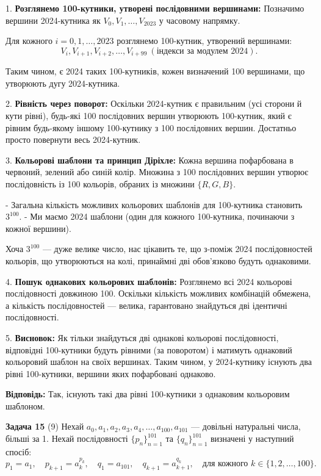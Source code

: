\documentclass{article}
\begin{document}
1. \textbf{Розглянемо 100-кутники, утворені послідовними вершинами:}  
   Позначимо вершини 2024-кутника як \(V_0, V_1, \dots, V_{2023}\) у часовому напрямку.  

   Для кожного \(i = 0, 1, \dots, 2023\) розглянемо 100-кутник, утворений вершинами:
   \[
   V_i, V_{i+1}, V_{i+2}, \dots, V_{i+99} \ (\text{індекси за модулем }2024).
   \]

   Таким чином, є 2024 таких 100-кутників, кожен визначений 100 вершинами, що утворюють дугу 2024-кутника.

2. \textbf{Рівність через поворот:}  
   Оскільки 2024-кутник є правильним (усі сторони й кути рівні), будь-які 100 послідовних вершин утворюють 100-кутник, який є рівним будь-якому іншому 100-кутнику з 100 послідовних вершин. Достатньо просто повернути весь 2024-кутник.

3. \textbf{Кольорові шаблони та принцип Діріхле:}  
   Кожна вершина пофарбована в червоний, зелений або синій колір. Множина з 100 послідовних вершин утворює послідовність із 100 кольорів, обраних із множини \(\{R, G, B\}\).

   - Загальна кількість можливих кольорових шаблонів для 100-кутника становить \(3^{100}\).
   - Ми маємо 2024 шаблони (один для кожного 100-кутника, починаючи з кожної вершини).

   Хоча \(3^{100}\) — дуже велике число, нас цікавить те, що з-поміж 2024 послідовностей кольорів, що утворюються на колі, принаймні дві обов’язково будуть однаковими.

4. \textbf{Пошук однакових кольорових шаблонів:}  
   Розглянемо всі 2024 кольорові послідовності довжиною 100. Оскільки кількість можливих комбінацій обмежена, а кількість послідовностей — велика, гарантовано знайдуться дві ідентичні послідовності.

5. \textbf{Висновок:}  
   Як тільки знайдуться дві однакові кольорові послідовності, відповідні 100-кутники будуть рівними (за поворотом) і матимуть однаковий кольоровий шаблон на своїх вершинах. Таким чином, у 2024-кутнику існують два рівні 100-кутники, вершини яких пофарбовані однаково.

\textbf{Відповідь:}  
Так, існують такі два рівні 100-кутники з однаковим кольоровим шаблоном.


\bigskip

\noindent\textbf{Задача 15} (9) Нехай \( a_0, a_1, a_2, a_3, a_4, \dots, a_{100}, a_{101} \) — довільні натуральні числа, більші за 1. Нехай послідовності \( \{p_n\}_{n=1}^{101} \) та \( \{q_n\}_{n=1}^{101} \) визначені у наступний спосіб:
\[
p_1 = a_1, \quad p_{k+1} = a_k^{p_k}, \quad q_1 = a_{101}, \quad q_{k+1} = a_{k+1}^{q_k}, \quad \text{для кожного } k \in \{1, 2, \dots, 100\}.
\]
\end{document}
